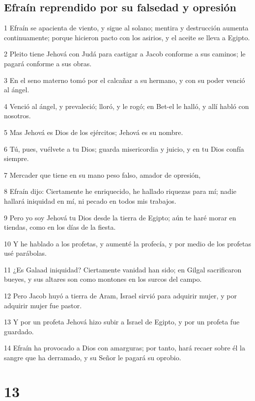 \section*{Efraín reprendido por su falsedad y opresión}

\par 1 Efraín se apacienta de viento, y sigue al solano; mentira y destrucción aumenta continuamente; porque hicieron pacto con los asirios, y el aceite se lleva a Egipto.
\par 2 Pleito tiene Jehová con Judá para castigar a Jacob conforme a sus caminos; le pagará conforme a sus obras.
\par 3 En el seno materno tomó por el calcañar a su hermano, y con su poder venció al ángel.
\par 4 Venció al ángel, y prevaleció; lloró, y le rogó; en Bet-el le halló, y allí habló con nosotros.
\par 5 Mas Jehová es Dios de los ejércitos; Jehová es su nombre.
\par 6 Tú, pues, vuélvete a tu Dios; guarda misericordia y juicio, y en tu Dios confía siempre.
\par 7 Mercader que tiene en su mano peso falso, amador de opresión,
\par 8 Efraín dijo: Ciertamente he enriquecido, he hallado riquezas para mí; nadie hallará iniquidad en mí, ni pecado en todos mis trabajos.
\par 9 Pero yo soy Jehová tu Dios desde la tierra de Egipto; aún te haré morar en tiendas, como en los días de la fiesta. 
\par 10 Y he hablado a los profetas, y aumenté la profecía, y por medio de los profetas usé parábolas.
\par 11 ¿Es Galaad iniquidad? Ciertamente vanidad han sido; en Gilgal sacrificaron bueyes, y sus altares son como montones en los surcos del campo.
\par 12 Pero Jacob huyó a tierra de Aram, Israel sirvió para adquirir mujer, y por adquirir mujer fue pastor. 
\par 13 Y por un profeta Jehová hizo subir a Israel de Egipto, y por un profeta fue guardado. 
\par 14 Efraín ha provocado a Dios con amarguras; por tanto, hará recaer sobre él la sangre que ha derramado, y su Señor le pagará su oprobio.

\chapter{13}

